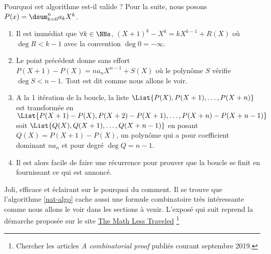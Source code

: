 Pourquoi cet algorithme est-il valide ? Pour la suite, nous posons $P(x) = \dsum_{k=0}^{n} a_k X^k$.
\begin{enumerate}
	\item Il est immédiat que $\forall k \in \NNs$, $(X+1)^k - X^k = kX^{k-1} + R(X)$ où $\deg R < k-1$ avec la convention $\deg 0 = - \infty$.


	\item Le point précédent donne sans effort $P(X+1) - P(X) = n a_n X^{n-1} + S(X)$ où le polynôme $S$ vérifie $\deg S < n-1$. Tout est dit comme nous allons le voir.


	\item A la 1\iere{} itération de la boucle, la liste 
			  $\List{P(X) , P(X+1) , \dots , P(X+n)}$
	 	  est transformée en 
		      $\List{P(X+1) - P(X) , P(X+2) - P(X+1) , \dots , P(X+n) - P(X+n-1)}$
		  soit $\List{Q(X) , Q(X+1) , \dots , Q(X+n-1)}$
		  en posant $Q(X) = P(X+1) - P(X)$, un polynôme qui a pour coefficient dominant $n a_n$ et pour degré $\deg Q = n - 1$.


	\item Il est alors facile de faire une récurrence pour prouver que la boucle se finit en fournissant ce qui est annoncé.  
\end{enumerate}

Joli, efficace et éclairant sur le pourquoi du comment. Il se trouve que l'algorithme \ref{nat-algo} cache aussi une formule combinatoire très intéressante comme nous allons le voir dans les sections à venir.
L'exposé qui suit reprend la démarche proposée sur le site \href{https://mathlesstraveled.com}{The Math Less Traveled}
\footnote{
	Chercher les articles \emph{\og A combinatorial proof \fg} publiés courant septembre 2019.
} 
